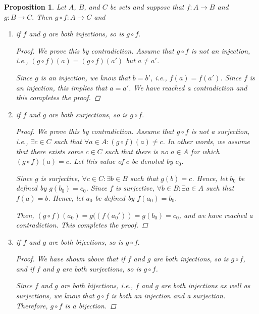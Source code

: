 \documentclass[11pt]{article}
\newtheorem{proposition}[theorem]{Proposition}
\theoremstyle{definition}
\numberwithin{equation}{subsection}
\begin{document}
\begin{proposition}  Let $A$, $B$, and $C$ be sets and suppose that $f:A\longrightarrow B$  and  $g:B\longrightarrow C.$  Then $g\circ f:A\longrightarrow C$ and
\begin{enumerate}
\item[a)] if $f$ and $g$ are both injections, so is $g\circ f.$
\begin{proof}
We prove this by contradiction. Assume that $g \circ f$ is not an injection, i.e., $(g \circ f)(a)=(g \circ f)(a')$ but $a \not = a'$. 

Since $g$ is an injection, we know that $b = b'$, i.e., $f(a) = f(a')$. Since $f$ is an injection, this implies that $a = a'$. We have reached a contradiction and this completes the proof.

\renewcommand\qedsymbol{QED}
\end{proof}
\item[b)] if $f$ and $g$ are both surjections, so is $g\circ f.$
\begin{proof}
We prove this by contradiction. Assume that $g \circ f$ is not a surjection, i.e., $\exists c \in C$ such that $\forall a \in A: (g \circ f)(a) \not = c$. In other words, we assume that there exists some $c \in C$ such that there is no $a \in A$ for which $(g \circ f)(a)=c$. Let this value of $c$ be denoted by $c_0$.

Since $g$ is surjective, $\forall c\in C: \exists b \in B$ such that $g(b) = c$. Hence, let $b_0$ be defined by $g(b_0)=c_0$. Since $f$ is surjective, $\forall b\in B: \exists a \in A$ such that $f(a) = b$. Hence, let $a_0$ be defined by $f(a_0)=b_0$.

Then, $(g \circ f)(a_0)=g((f(a_0'))=g(b_0)=c_0$, and we have reached a contradiction. This completes the proof. 

\renewcommand\qedsymbol{QED}
\end{proof}
\item[c)] if $f$ and $g$ are both bijections, so is $g\circ f.$
\begin{proof}

We have shown above that if $f$ and $g$ are both injections, so is $g\circ f$, and if $f$ and $g$ are both surjections, so is $g\circ f$.

Since $f$ and $g$ are both bijections, i.e., $f$ and $g$ are both injections as well as surjections, we know that $g\circ f$ is both an injection and a surjection. Therefore, $g\circ f$ is a bijection.

\renewcommand\qedsymbol{QED}
\end{proof}
\end{enumerate}
\end{proposition} 
\end{document}
